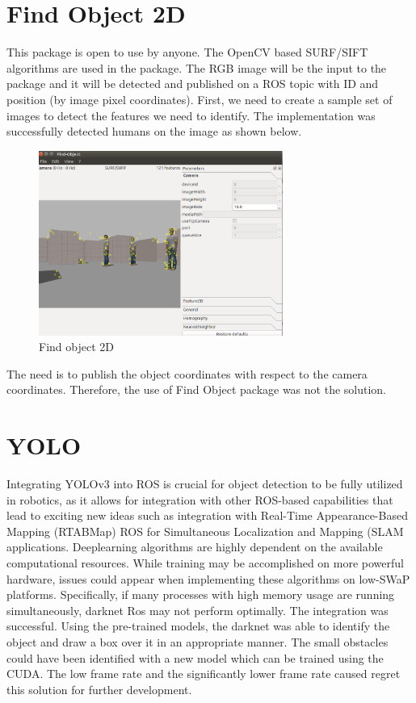 \documentclass[twoside,12pt,times,onecolumn,a4paper]{report}
\begin{document}
\section{Find Object 2D}

This package is open to use by anyone. The OpenCV based SURF/SIFT algorithms are used in the package. The RGB image will be the input to the package and it will be detected and published on a ROS topic with ID and position (by image pixel coordinates). First, we need to create a sample set of images to detect the features we need to identify. The implementation was successfully detected humans on the image as shown below.

\begin{figure}[!h]
  \centering
   \includegraphics[width=8cm]{object_detection-fo2d}
  \caption{Find object 2D}
\end{figure}

The need is to publish the object coordinates with respect to the camera 
coordinates. Therefore, the use of Find Object package was not the solution.

\section{YOLO}

Integrating YOLOv3 into ROS is crucial for object detection to be fully utilized in 
robotics, as it allows for integration with other ROS-based capabilities that lead to exciting 
new ideas such as integration with Real-Time Appearance-Based Mapping 
(RTABMap) ROS for Simultaneous Localization and Mapping (SLAM applications. Deeplearning algorithms are highly dependent on the available computational resources. While 
training may be accomplished on more powerful hardware, issues could appear when 
implementing these algorithms on low-SWaP platforms. Specifically, if many processes 
with high memory usage are running simultaneously, darknet Ros may not perform 
optimally.
The integration was successful. Using the pre-trained models, the darknet was able 
to identify the object and draw a box over it in an appropriate manner. The small obstacles 
could have been identified with a new model which can be trained using the CUDA. The 
low frame rate and the significantly lower frame rate caused regret this solution for further 
development. 
\end{document}
